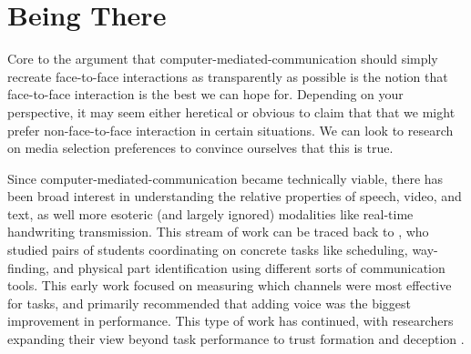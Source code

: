 
\section{Being There}
Core to the argument that computer-mediated-communication should simply recreate face-to-face interactions as transparently as possible is the notion that face-to-face interaction is the best we can hope for. Depending on your perspective, it may seem either heretical or obvious to claim that that we might prefer non-face-to-face interaction in certain situations. We can look to research on media selection preferences to convince ourselves that this is true.

Since computer-mediated-communication became technically viable, there has been broad interest in understanding the relative properties of speech, video, and text, as well more esoteric (and largely ignored) modalities like real-time handwriting transmission. \citep{Williams:1977p682} This stream of work can be traced back to \citet{Ochsman:1974vu}, who studied pairs of students coordinating on concrete tasks like scheduling, way-finding, and physical part identification using different sorts of communication tools. This early work focused on measuring which channels were most effective for tasks, and primarily recommended that adding voice was the biggest improvement in performance. This type of work has continued, with researchers expanding their view beyond task performance to trust formation \citep{Bos:2002p256}\citep{Toma:2010p347} and deception \citep{Hancock:2004p314}.


